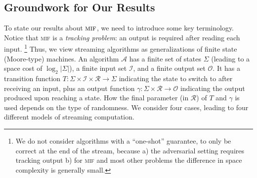 \documentclass[10pt,a4paper]{article}
\theoremstyle{definition}
\theoremstyle{remark}
\newcommand{\cA}{\mathcal{A}}
\newcommand{\cI}{\mathcal{I}}
\newcommand{\cO}{\mathcal{O}}
\newcommand{\cR}{\mathcal{R}}
\newcommand{\mif}{\textsc{mif}\xspace}
\newcommand{\trans}{T}                      %
\begin{document}
\subsection{Groundwork for Our Results}\label{subsec:models}

To state our results about $\mif$, we need to introduce some key terminology.
Notice that \mif is a {\em tracking problem}: an output is required after
reading each input.%
%
\footnote{We do not consider algorithms with a ``one-shot'' guarantee, to only
be correct at the end of the stream, because a) the adversarial setting
requires tracking output b) for \mif and most other problems the difference
in space complexity is generally small.} 
%
Thus, we view streaming algorithms as generalizations of finite state
(Moore-type) machines. An algorithm $\cA$ has a finite set of states $\Sigma$
(leading to a space cost of $\log_2|\Sigma|$), a finite input set $\cI$, and a
finite output set $\cO$.  It has a transition function $\trans \colon \Sigma
\times \cI \times \cR \to \Sigma$ indicating the state to switch to after
receiving an input, plus an output function $\gamma \colon \Sigma \times \cR
\to \cO$ indicating the output produced upon reaching a state. How the final
parameter (in $\cR$) of $\trans$ and $\gamma$ is used depends on the type of
randomness. We consider four cases, leading to four different models of
streaming computation.
\end{document}
